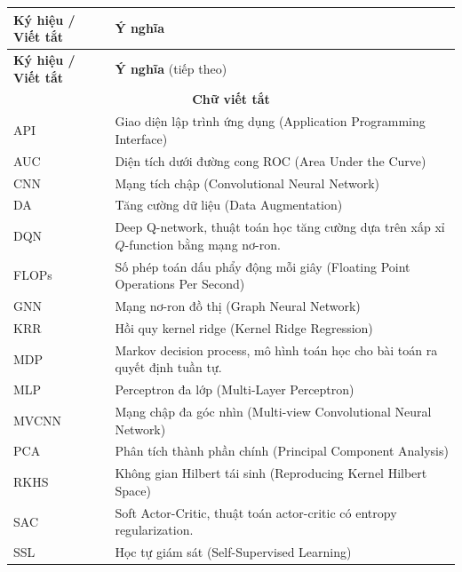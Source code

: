 \documentclass[oneside]{hcmus-report}
\theoremstyle{plain}
\theoremstyle{definition}
\begin{document}
\begin{longtable}{p{} p{}}
\textbf{Ký hiệu / Viết tắt} & \textbf{Ý nghĩa} \\
\hline
\endfirsthead

\textbf{Ký hiệu / Viết tắt} & \textbf{Ý nghĩa} (tiếp theo) \\
\hline
\endhead

\multicolumn{2}{c}{\textbf{Chữ viết tắt}} \\
\hline
API & Giao diện lập trình ứng dụng (Application Programming Interface) \\
AUC & Diện tích dưới đường cong ROC (Area Under the Curve) \\
CNN & Mạng tích chập (Convolutional Neural Network) \\
DA & Tăng cường dữ liệu (Data Augmentation) \\
DQN & Deep Q-network, thuật toán học tăng cường dựa trên xấp xỉ $Q$-function bằng mạng nơ-ron.\\
FLOPs & Số phép toán dấu phẩy động mỗi giây (Floating Point Operations Per Second) \\
GNN & Mạng nơ-ron đồ thị (Graph Neural Network) \\
KRR & Hồi quy kernel ridge (Kernel Ridge Regression) \\
MDP & Markov decision process, mô hình toán học cho bài toán ra quyết định tuần tự.\\
MLP & Perceptron đa lớp (Multi-Layer Perceptron) \\
MVCNN & Mạng chập đa góc nhìn (Multi-view Convolutional Neural Network) \\
PCA & Phân tích thành phần chính (Principal Component Analysis) \\
RKHS & Không gian Hilbert tái sinh (Reproducing Kernel Hilbert Space) \\
SAC & Soft Actor-Critic, thuật toán actor-critic có entropy regularization.\\
SSL & Học tự giám sát (Self-Supervised Learning) \\

\hline



\end{longtable}
\end{document}

